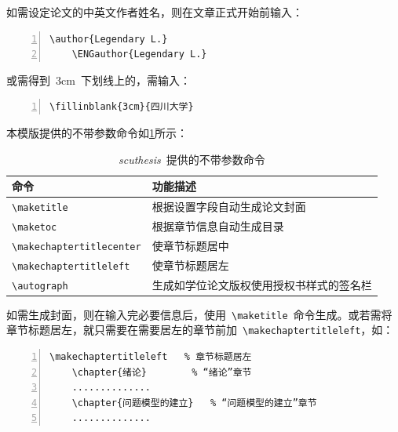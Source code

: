 如需设定论文的中英文作者姓名，则在文章正式开始前输入：
\begin{Verbatim}[gobble=1,frame=single,numbers=left]
	\author{Legendary L.}
	\ENGauthor{Legendary L.}
\end{Verbatim}


或需得到~3cm~下划线上的，需输入：
\begin{Verbatim}[gobble=1,frame=single,numbers=left]
	\fillinblank{3cm}{四川大学}
\end{Verbatim}


本模版提供的不带参数命令如\cref{table_ProvidedCommandsWithoutPar}所示：
\begin{table}[h]
	\caption{\emph{scuthesis}~提供的不带参数命令}
	\label{table_ProvidedCommandsWithoutPar}
	\begin{tabular*}{\textwidth}{l@{\extracolsep{\fill}}p{}}
		\toprule
		\textbf{命令} & \textbf{功能描述} \\
		\midrule
		\verb|\maketitle| & 根据设置字段自动生成论文封面\\
		\verb|\maketoc| & 根据章节信息自动生成目录\\
		\verb|\makechaptertitlecenter| & 使章节标题居中\\
		\verb|\makechaptertitleleft| & 使章节标题居左\\
		\verb|\autograph| & 生成如学位论文版权使用授权书样式的签名栏\\
		\bottomrule
	\end{tabular*}
\end{table}


如需生成封面，则在输入完必要信息后，使用~\verb|\maketitle|~命令生成。或若需将章节标题居左，就只需要在需要居左的章节前加~\verb|\makechaptertitleleft|，如：
\begin{Verbatim}[gobble=1,frame=single,numbers=left]
	\makechaptertitleleft	% 章节标题居左
	\chapter{绪论}		% “绪论”章节
	..............
	\chapter{问题模型的建立}	% “问题模型的建立”章节
	..............
\end{Verbatim}

